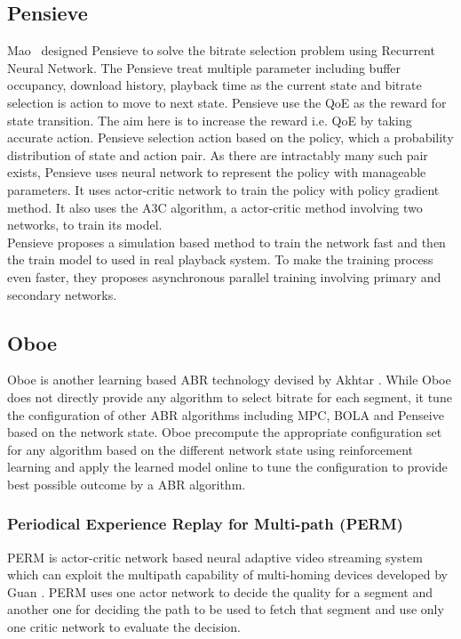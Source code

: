 \subsection{Pensieve}
Mao \etal\ designed Pensieve\cite{10.1145/3098822.3098843} to solve the bitrate selection problem using Recurrent Neural Network. The Pensieve treat multiple parameter including buffer occupancy, download history, playback time as the current state and bitrate selection is action to move to next state. Pensieve use the QoE as the reward for state transition. The aim here is to increase the reward i.e. QoE by taking accurate action. Pensieve selection action based on the policy, which a probability distribution of state and action pair. As there are intractably many such pair exists, Pensieve uses neural network to represent the policy with manageable parameters. It uses actor-critic network to train the policy with policy gradient method\cite{sutton1999policy}. It also uses the A3C\cite{10.5555/3045390.3045594} algorithm, a actor-critic method involving two networks, to train its model.\\
Pensieve proposes a simulation based method to train the network fast and then the train model to used in real playback system. To make the training process even faster, they proposes asynchronous parallel training involving primary and secondary networks.

\subsection{Oboe}
Oboe\cite{10.1145/3230543.3230558} is another learning based ABR technology devised by Akhtar \etal. While Oboe does not directly provide any algorithm to select bitrate for each segment, it tune the configuration of other ABR algorithms including MPC\cite{10.1145/2785956.2787486,10.1145/2670518.2673877}, BOLA\cite{7524428} and Penseive\cite{10.1145/3098822.3098843} based on the network state. Oboe precompute the appropriate configuration set for any algorithm based on the different network state using reinforcement learning and apply the learned model online to tune the configuration to provide best possible outcome by a ABR algorithm.


\subsubsection{Periodical Experience Replay for Multi-path (PERM)}
PERM\cite{9155492} is actor-critic network based neural adaptive video streaming system which can exploit the multipath capability of multi-homing devices developed by Guan \etal. PERM uses one actor network to decide the quality for a segment and another one for deciding the path to be used to fetch that segment and use only one critic network to evaluate the decision.

